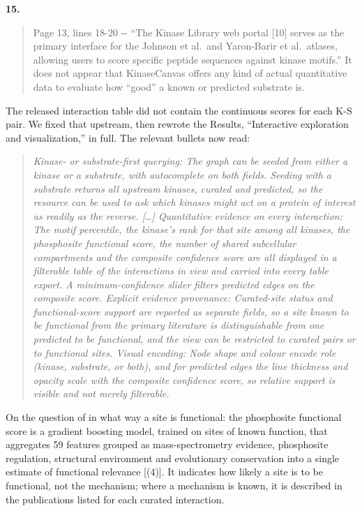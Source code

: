 \documentclass[
]{article}
\begin{document}
\textbf{15.}

\begin{quote}
Page 13, lines 18-20 -\/- ``The Kinase Library web portal {[}10{]}
serves as the primary interface for the Johnson et al.~and Yaron-Barir
et al.~atlases, allowing users to score specific peptide sequences
against kinase motifs.'' It does not appear that KinaseCanvas offers any
kind of actual quantitative data to evaluate how ``good'' a known or
predicted substrate is.
\end{quote}

The released interaction table did not contain the continuous scores for
each K-S pair. We fixed that upstream, then rewrote the Results,
``Interactive exploration and visualization,'' in full. The relevant
bullets now read:

\begin{quote}
\emph{Kinase- or substrate-first querying: The graph can be seeded from
either a kinase or a substrate, with autocomplete on both fields.
Seeding with a substrate returns all upstream kinases, curated and
predicted, so the resource can be used to ask which kinases might act on
a protein of interest as readily as the reverse. {[}\ldots{]}
Quantitative evidence on every interaction: The motif percentile, the
kinase's rank for that site among all kinases, the phosphosite
functional score, the number of shared subcellular compartments and the
composite confidence score are all displayed in a filterable table of
the interactions in view and carried into every table export. A
minimum-confidence slider filters predicted edges on the composite
score. Explicit evidence provenance: Curated-site status and
functional-score support are reported as separate fields, so a site
known to be functional from the primary literature is distinguishable
from one predicted to be functional, and the view can be restricted to
curated pairs or to functional sites. Visual encoding: Node shape and
colour encode role (kinase, substrate, or both), and for predicted edges
the line thickness and opacity scale with the composite confidence
score, so relative support is visible and not merely filterable.}
\end{quote}

On the question of in what way a site is functional: the phosphosite
functional score is a gradient boosting model, trained on sites of known
function, that aggregates 59 features grouped as mass-spectrometry
evidence, phosphosite regulation, structural environment and
evolutionary conservation into a single estimate of functional relevance
{[}(4){]}. It indicates how likely a site is to be functional, not the
mechanism; where a mechanism is known, it is described in the
publications listed for each curated interaction.
\end{document}
